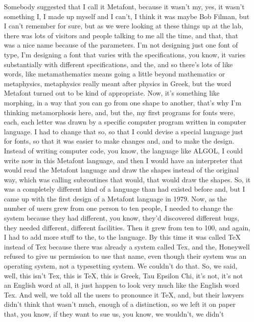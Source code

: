 \documentclass[]{article}
\begin{document}
Somebody suggested that I call it Metafont, because it wasn't my, yes,
it wasn't something I, I made up myself and I can't, I think it was
maybe Bob Filman, but I can't remember for sure, but as we were looking
at these things up at the lab, there was lots of visitors and people
talking to me all the time, and that, that was a nice name because of
the parameters. I'm not designing just one font of type, I'm designing a
font that varies with the specifications, you know, it varies
substantially with different specifications, and the, and so there's
lots of like words, like metamathematics means going a little beyond
mathematics or metaphysics, metaphysics really meant after physics in
Greek, but the word Metafont turned out to be kind of appropriate. Now,
it's something like morphing, in a way that you can go from one shape to
another, that's why I'm thinking metamorphosis here, and, but the, my
first programs for fonts were, each, each letter was drawn by a specific
computer program written in computer language. I had to change that so,
so that I could devise a special language just for fonts, so that it was
easier to make changes and, and to make the design. Instead of writing
computer code, you know, the language like ALGOL, I could write now in
this Metafont language, and then I would have an interpreter that would
read the Metafont language and draw the shapes instead of the original
way, which was calling subroutines that would, that would draw the
shapes. So, it was a completely different kind of a language than had
existed before and, but I came up with the first design of a Metafont
language in 1979. Now, as the number of users grew from one person to
ten people, I needed to change the system because they had different,
you know, they'd discovered different bugs, they needed different,
different facilities. Then it grew from ten to 100, and again, I had to
add more stuff to the, to the language. By this time it was called TeX
instead of Tex because there was already a system called Tex, and the,
Honeywell refused to give us permission to use that name, even though
their system was an operating system, not a typesetting system. We
couldn't do that. So, we said, well, this isn't Tex, this is TeX, this
is Greek, Tau Epsilon Chi, it's not, it's not an English word at all, it
just happen to look very much like the English word Tex. And well, we
told all the users to pronounce it TeX, and, but their lawyers didn't
think that wasn't much, enough of a distinction, so we left it on paper
that, you know, if they want to sue us, you know, we wouldn't, we didn't
\end{document}
